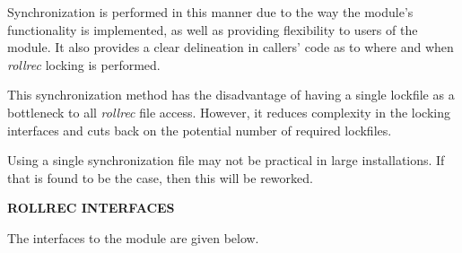 Synchronization is performed in this manner due to the way the module's
functionality is implemented, as well as providing flexibility to users
of the module.  It also provides a clear delineation in callers' code as
to where and when {\it rollrec} locking is performed.

This synchronization method has the disadvantage of having a single lockfile
as a bottleneck to all {\it rollrec} file access.  However, it reduces
complexity in the locking interfaces and cuts back on the potential number of
required lockfiles.

Using a single synchronization file may not be practical in large
installations.  If that is found to be the case, then this will be reworked.

{\bf ROLLREC INTERFACES}

The interfaces to the  module are given
below.

